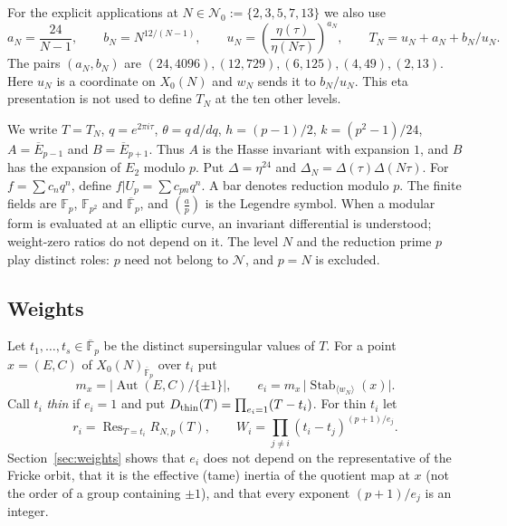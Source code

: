 \documentclass[11pt,a4paper]{article}
\numberwithin{equation}{section}
\theoremstyle{definition}
\theoremstyle{remark}
\newcommand{\Fp}{\mathbb F_p}
\newcommand{\Fq}{\mathbb F_{p^2}}
\newcommand{\Fb}{\overline{\mathbb F}_p}
\newcommand{\Res}{\operatorname{Res}}
\newcommand{\Aut}{\operatorname{Aut}}
\newcommand{\Stab}{\operatorname{Stab}}
\begin{document}
For the explicit applications at
$N\in\mathcal N_0:=\{2,3,5,7,13\}$ we also use
\[
a_N=\frac{24}{N-1},\qquad b_N=N^{12/(N-1)},\qquad
u_N=\left(\frac{\eta(\tau)}{\eta(N\tau)}\right)^{a_N},\qquad
T_N=u_N+a_N+b_N/u_N.
\]
The pairs $(a_N,b_N)$ are $(24,4096),(12,729),(6,125),(4,49),(2,13)$.
Here $u_N$ is a coordinate on $X_0(N)$ and $w_N$ sends it to $b_N/u_N$.
This eta presentation is not used to define $T_N$ at the ten other levels.

We write $T=T_N$, $q=e^{2\pi i\tau}$, $\theta=q\,d/dq$,
$h=(p-1)/2$, $k=(p^2-1)/24$, $A=\overline E_{p-1}$ and
$B=\overline E_{p+1}$. Thus $A$ is the Hasse invariant with expansion
$1$, and $B$ has the expansion of $E_2$ modulo $p$. Put
$\Delta=\eta^{24}$ and $\Delta_N=\Delta(\tau)\Delta(N\tau)$.
For $f=\sum c_nq^n$, define $f|U_p=\sum c_{pn}q^n$.
A bar denotes reduction modulo $p$. The finite fields are
$\Fp$, $\Fq$ and $\Fb$, and $\left(\frac{a}{p}\right)$ is the Legendre symbol.
When a modular form is evaluated at an elliptic curve, an invariant
differential is understood; weight-zero ratios do not depend on it.
The level $N$ and the reduction prime $p$ play distinct roles:
$p$ need not belong to $\mathcal N$, and $p=N$ is excluded.

\subsection{Weights}
Let $t_1,\dots,t_s\in\Fb$ be the distinct supersingular values of $T$. For a point
$x=(E,C)$ of $X_0(N)_{\Fb}$ over $t_i$ put
\[
m_x=\bigl|\Aut(E,C)/\{\pm1\}\bigr|,\qquad e_i=m_x\,\bigl|\Stab_{\langle w_N\rangle}(x)\bigr|.
\]
Call $t_i$ \emph{thin} if $e_i=1$ and put $D_{\rm thin}(T)=\prod_{e_i=1}(T-t_i)$. For thin $t_i$ let
\[
r_i=\Res_{T=t_i}R_{N,p}(T),\qquad W_i=\prod_{j\ne i}(t_i-t_j)^{(p+1)/e_j}.
\]
Section~\ref{sec:weights} shows that $e_i$ does not depend on the representative of the Fricke
orbit, that it is the effective (tame) inertia of the quotient map at $x$ (not the order of a group
containing $\pm1$), and that every exponent $(p+1)/e_j$ is an integer.
\end{document}

